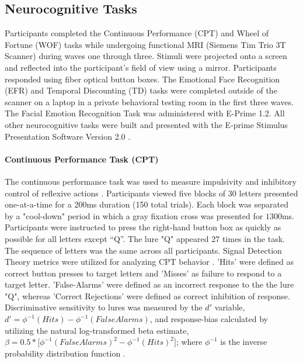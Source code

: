 \documentclass[utf8]{stylesheet}
\begin{document}
\subsection{Neurocognitive Tasks}  Participants completed the Continuous Performance (CPT) and Wheel of Fortune (WOF) tasks while undergoing functional MRI (Siemens Tim Trio 3T Scanner) during waves one through three. Stimuli were projected onto a screen and reflected into the participant's field of view using a mirror. Participants responded using fiber optical button boxes. The Emotional Face Recognition (EFR) and Temporal Discounting (TD) tasks were completed outside of the scanner on a laptop in a private behavioral testing room in the first three waves. The Facial Emotion Recognition Task was administered with E-Prime 1.2. All other neurocognitive tasks were built and presented with the E-prime Stimulus Presentation Software Version 2.0 \citep{schneider2002prime}. 
\paragraph{Continuous Performance Task (CPT)} The continuous performance task was used to measure impulsivity and inhibitory control of reflexive actions \citep{horn2003response}.  Participants viewed five blocks of $30$ letters presented one-at-a-time for a $200$ms duration (150 total trials). Each block was separated by a "cool-down" period in which a gray fixation cross was presented for $1300$ms. Participants were instructed to press the right-hand button box as quickly as possible for all letters except “Q”. The lure "Q" appeared 27 times in the task. The sequence of letters was the same across all participants.  Signal Detection Theory metrics were utilized for analyzing CPT behavior \cite{stanislaw1999calculation}. 'Hits' were defined as correct button presses to target letters and 'Misses' as failure to respond to a target letter. 'False-Alarms' were defined as an incorrect response to the the lure "Q", whereas 'Correct Rejections' were defined as correct inhibition of response. Discriminative sensitivity to lures was measured by the $d'$ variable, $d'=\phi^{-1}( Hits ) - \phi^{-1}( False Alarms )$, and response-bias calculated by utilizing the natural log-transformed beta estimate, $ \beta = 0.5*\Big[\phi^{-1}(FalseAlarms)^{2} - \phi^{-1}(Hits)^{2}\Big]$; where $\phi^{-1}$ is the inverse probability distribution function  \citep{forbes2011statistical}. 
\end{document}
